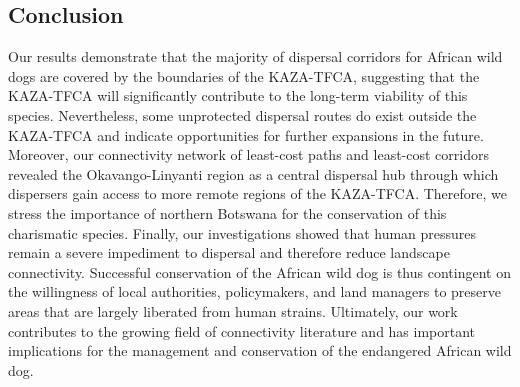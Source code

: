 \documentclass[abstract=on,10pt,a4paper,bibliography=totocnumbered]{scrartcl}
\begin{document}
\newpage
\subsection{Conclusion}
Our results demonstrate that the majority of dispersal corridors for African
wild dogs are covered by the boundaries of the KAZA-TFCA, suggesting that the
KAZA-TFCA will significantly contribute to the long-term viability of this
species. Nevertheless, some unprotected dispersal routes do exist outside the
KAZA-TFCA and indicate opportunities for further expansions in the future.
Moreover, our connectivity network of least-cost paths and least-cost corridors
revealed the Okavango-Linyanti region as a central dispersal hub through which
dispersers gain access to more remote regions of the KAZA-TFCA. Therefore, we
stress the importance of northern Botswana for the conservation of this
charismatic species. Finally, our investigations showed that human pressures
remain a severe impediment to dispersal and therefore reduce landscape
connectivity. Successful conservation of the African wild dog is thus contingent
on the willingness of local authorities, policymakers, and land managers to
preserve areas that are largely liberated from human strains. Ultimately, our
work contributes to the growing field of connectivity literature and has
important implications for the management and conservation of the endangered
African wild dog.

\newpage
\end{document}
